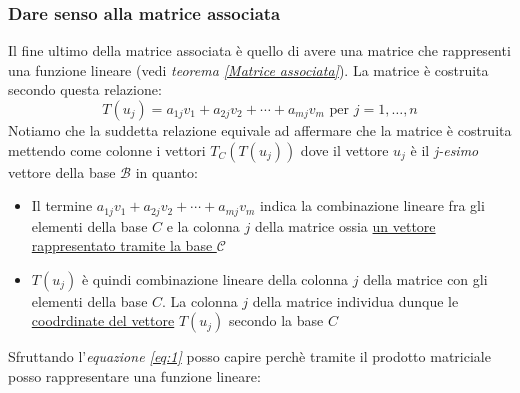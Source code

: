 \documentclass[12pt,a4paper,oneside]{article}
\begin{document}
\subsubsection*{Dare senso alla matrice associata}
Il fine ultimo della matrice associata è quello di avere una matrice che rappresenti una funzione lineare (vedi \textit{teorema  \ref{Matrice associata}}). La matrice è costruita secondo questa relazione:
\begin{equation} \label{eq:1}
	T\left(u_j\right)=a_{1 j} v_1+a_{2 j} v_2+\cdots+a_{m j} v_m \text{ per } j=1, \ldots, n
\end{equation}
Notiamo che la suddetta relazione equivale ad affermare che la matrice è costruita mettendo come colonne i vettori $ T_C \left( T\left( u_j \right)  \right)  $ dove il vettore $ u_j $ è il \textit{j-esimo} vettore della base $ \mathcal{B} $ in quanto:
\begin{itemize}
	\item  Il termine $ a_{1 j} v_1+a_{2 j} v_2+\cdots+a_{m j} v_m  $ indica la combinazione lineare fra gli elementi della base $ C $ e la colonna $ j $ della matrice ossia \underline{un vettore rappresentato tramite la base $ \mathcal{C} $}
	\item $ T\left( u_j \right)  $ è quindi combinazione lineare della colonna $ j $ della matrice con gli elementi della base $ C $. La colonna $ j $ della matrice individua dunque le \underline{coodrdinate del vettore} $ T\left( u_j \right)  $ secondo la base $ C $
\end{itemize}
Sfruttando l'\textit{equazione \ref{eq:1}} posso capire perchè tramite il prodotto matriciale posso rappresentare una funzione lineare:
\end{document}
